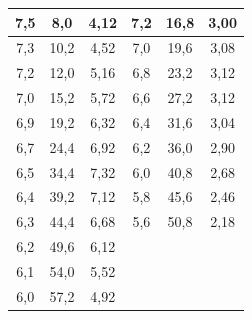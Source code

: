 \documentclass[a4paper, 12pt]{article}
\begin{document}
\begin{table}[H]
\begin{tabular}{|ccc|ccc}
	\multicolumn{1}{|c|}{7,5}       & \multicolumn{1}{c|}{8,0}             & 4,12   & \multicolumn{1}{c|}{7,2}       & \multicolumn{1}{c|}{16,8}            & \multicolumn{1}{c|}{3,00}   \\ \hline
	\multicolumn{1}{|c|}{7,3}       & \multicolumn{1}{c|}{10,2}            & 4,52   & \multicolumn{1}{c|}{7,0}       & \multicolumn{1}{c|}{19,6}            & \multicolumn{1}{c|}{3,08}   \\ \hline
	\multicolumn{1}{|c|}{7,2}       & \multicolumn{1}{c|}{12,0}            & 5,16   & \multicolumn{1}{c|}{6,8}       & \multicolumn{1}{c|}{23,2}            & \multicolumn{1}{c|}{3,12}   \\ \hline
	\multicolumn{1}{|c|}{7,0}       & \multicolumn{1}{c|}{15,2}            & 5,72   & \multicolumn{1}{c|}{6,6}       & \multicolumn{1}{c|}{27,2}            & \multicolumn{1}{c|}{3,12}   \\ \hline
	\multicolumn{1}{|c|}{6,9}       & \multicolumn{1}{c|}{19,2}            & 6,32   & \multicolumn{1}{c|}{6,4}       & \multicolumn{1}{c|}{31,6}            & \multicolumn{1}{c|}{3,04}   \\ \hline
	\multicolumn{1}{|c|}{6,7}       & \multicolumn{1}{c|}{24,4}            & 6,92   & \multicolumn{1}{c|}{6,2}       & \multicolumn{1}{c|}{36,0}            & \multicolumn{1}{c|}{2,90}   \\ \hline
	\multicolumn{1}{|c|}{6,5}       & \multicolumn{1}{c|}{34,4}            & 7,32   & \multicolumn{1}{c|}{6,0}       & \multicolumn{1}{c|}{40,8}            & \multicolumn{1}{c|}{2,68}   \\ \hline
	\multicolumn{1}{|c|}{6,4}       & \multicolumn{1}{c|}{39,2}            & 7,12   & \multicolumn{1}{c|}{5,8}       & \multicolumn{1}{c|}{45,6}            & \multicolumn{1}{c|}{2,46}   \\ \hline
	\multicolumn{1}{|c|}{6,3}       & \multicolumn{1}{c|}{44,4}            & 6,68   & \multicolumn{1}{c|}{5,6}       & \multicolumn{1}{c|}{50,8}            & \multicolumn{1}{c|}{2,18}   \\ \hline
	\multicolumn{1}{|c|}{6,2}       & \multicolumn{1}{c|}{49,6}            & 6,12   & \multicolumn{1}{l}{}           & \multicolumn{1}{l}{}                 & \multicolumn{1}{l}{}        \\ \cline{1-3}
	\multicolumn{1}{|c|}{6,1}       & \multicolumn{1}{c|}{54,0}            & 5,52   & \multicolumn{1}{l}{}           & \multicolumn{1}{l}{}                 & \multicolumn{1}{l}{}        \\ \cline{1-3}
	\multicolumn{1}{|c|}{6,0}       & \multicolumn{1}{c|}{57,2}            & 4,92   & \multicolumn{1}{l}{}           & \multicolumn{1}{l}{}                 & \multicolumn{1}{l}{}        \\ \cline{1-3}

\end{tabular}
\end{table}
\end{document}
